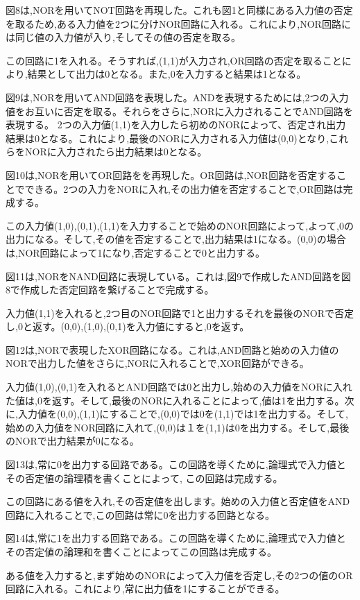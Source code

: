 \documentclass[a4paper,11pt,titlepage]{jarticle}
\begin{document}
図8は,NORを用いてNOT回路を再現した。これも図1と同様にある入力値の否定を取るため,ある入力値を2つに分けNOR回路に入れる。これにより,NOR回路には同じ値の入力値が入り,そしてその値の否定を取る。\par
この回路に1を入れる。そうすれば,(1,1)が入力され,OR回路の否定を取ることにより,結果として出力は0となる。また,0を入力すると結果は1となる。\par
図9は,NORを用いてAND回路を表現した。ANDを表現するためには,2つの入力値をお互いに否定を取る。それらをさらに,NORに入力されることでAND回路を表現する。
2つの入力値(1,1)を入力したら初めのNORによって、否定され出力結果は0となる。これにより,最後のNORに入力される入力値は(0,0)となり,これらをNORに入力されたら出力結果は0となる。\par
図10は,NORを用いてOR回路をを再現した。OR回路は,NOR回路を否定することでできる。2つの入力をNORに入れ,その出力値を否定することで,OR回路は完成する。\par
この入力値(1,0),(0,1),(1,1)を入力することで始めのNOR回路によって,よって,0の出力になる。そして,その値を否定することで,出力結果は1になる。(0,0)の場合は,NOR回路によって1になり,否定することで0と出力する。\par
図11は,NORをNAND回路に表現している。これは,図9で作成したAND回路を図8で作成した否定回路を繋げることで完成する。\par
入力値(1,1)を入れると,2つ目のNOR回路で1と出力するそれを最後のNORで否定し,0と返す。(0,0),(1,0),(0,1)を入力値にすると,0を返す。\par
図12は,NORで表現したXOR回路になる。これは,AND回路と始めの入力値のNORで出力した値をさらに,NORに入れることで,XOR回路ができる。\par
入力値(1,0),(0,1)を入れるとAND回路では0と出力し,始めの入力値をNORに入れた値は,0を返す。そして,最後のNORに入れることによって,値は1を出力する。次に,入力値を(0,0),(1,1)にすることで,(0,0)では0を(1,1)では1を出力する。そして,始めの入力値をNOR回路に入れて,(0,0)は１を(1,1)は0を出力する。そして,最後のNORで出力結果が0になる。\par
図13は,常に0を出力する回路である。この回路を導くために,論理式で入力値とその否定値の論理積を書くことによって,
この回路は完成する。\par
この回路にある値を入れ,その否定値を出します。始めの入力値と否定値をAND回路に入れることで,この回路は常に0を出力する回路となる。\par
図14は,常に1を出力する回路である。この回路を導くために,論理式で入力値とその否定値の論理和を書くことによってこの回路は完成する。\par
ある値を入力すると,まず始めのNORによって入力値を否定し,その2つの値のOR回路に入れる。これにより,常に出力値を1にすることができる。\par
\end{document}
